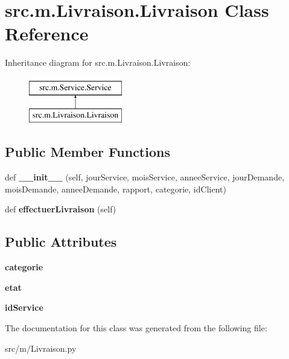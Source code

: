 \hypertarget{classsrc_1_1m_1_1_livraison_1_1_livraison}{}\section{src.\+m.\+Livraison.\+Livraison Class Reference}
\label{classsrc_1_1m_1_1_livraison_1_1_livraison}
Inheritance diagram for src.\+m.\+Livraison.\+Livraison\+:\begin{figure}[H]
\begin{center}
\leavevmode
\includegraphics[height=2.000000cm]{classsrc_1_1m_1_1_livraison_1_1_livraison}
\end{center}
\end{figure}
\subsection*{Public Member Functions}
\begin{DoxyCompactItemize}
\item 
\hypertarget{classsrc_1_1m_1_1_livraison_1_1_livraison_a404550a85e76d365bb8a60a81844ddee}{}def {\bfseries \+\_\+\+\_\+init\+\_\+\+\_\+} (self, jour\+Service, mois\+Service, annee\+Service, jour\+Demande, mois\+Demande, annee\+Demande, rapport, categorie, id\+Client)\label{classsrc_1_1m_1_1_livraison_1_1_livraison_a404550a85e76d365bb8a60a81844ddee}

\item 
\hypertarget{classsrc_1_1m_1_1_livraison_1_1_livraison_a348a9d1958ed18ce1be4967b1a58af7c}{}def {\bfseries effectuer\+Livraison} (self)\label{classsrc_1_1m_1_1_livraison_1_1_livraison_a348a9d1958ed18ce1be4967b1a58af7c}

\end{DoxyCompactItemize}
\subsection*{Public Attributes}
\begin{DoxyCompactItemize}
\item 
\hypertarget{classsrc_1_1m_1_1_livraison_1_1_livraison_a17979db8638ad2b3888a6c840ae2dc52}{}{\bfseries categorie}\label{classsrc_1_1m_1_1_livraison_1_1_livraison_a17979db8638ad2b3888a6c840ae2dc52}

\item 
\hypertarget{classsrc_1_1m_1_1_livraison_1_1_livraison_a98c21a55655b79bd3da6614d8f8ccb9b}{}{\bfseries etat}\label{classsrc_1_1m_1_1_livraison_1_1_livraison_a98c21a55655b79bd3da6614d8f8ccb9b}

\item 
\hypertarget{classsrc_1_1m_1_1_livraison_1_1_livraison_a68287b711fda2e911043236560ac4e70}{}{\bfseries id\+Service}\label{classsrc_1_1m_1_1_livraison_1_1_livraison_a68287b711fda2e911043236560ac4e70}

\end{DoxyCompactItemize}


The documentation for this class was generated from the following file\+:\begin{DoxyCompactItemize}
\item 
src/m/Livraison.\+py\end{DoxyCompactItemize}
